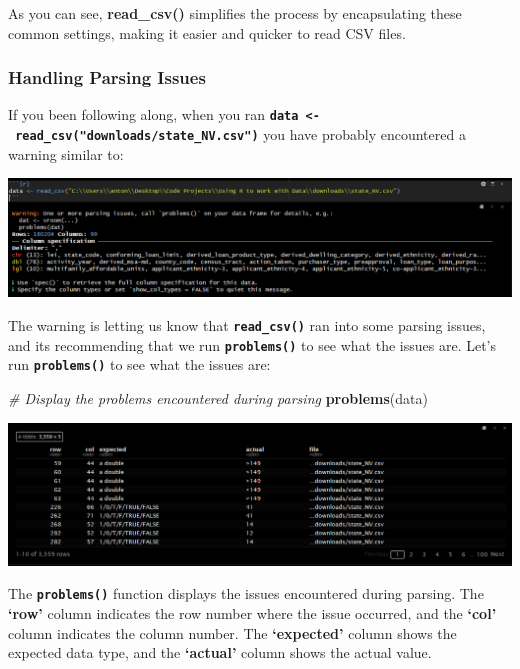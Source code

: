 \documentclass[
]{book}
\newenvironment{Shaded}{\begin{snugshade}}{\end{snugshade}}
\newcommand{\CommentTok}[1]{\textcolor[rgb]{0.56,0.35,0.01}{\textit{#1}}}
\newcommand{\FunctionTok}[1]{\textcolor[rgb]{0.13,0.29,0.53}{\textbf{#1}}}
\newcommand{\NormalTok}[1]{#1}
\begin{document}
As you can see, \textbf{read\_csv()} simplifies the process by encapsulating these common settings, making it easier and quicker to read CSV files.

\hypertarget{handling-parsing-issues}{%
\subsubsection{Handling Parsing Issues}\label{handling-parsing-issues}}

If you been following along, when you ran \textbf{\texttt{data\ \textless{}-\ read\_csv("downloads/state\_NV.csv")}} you have probably encountered a {warning} similar to:

\includegraphics{images/clipboard-3586307356.png}

The warning is letting us know that \textbf{\texttt{read\_csv()}} ran into some parsing issues, and its recommending that we run \textbf{\texttt{problems()}} to see what the issues are. Let's run \textbf{\texttt{problems()}} to see what the issues are:

\begin{Shaded}
\begin{Highlighting}[]
\CommentTok{\# Display the problems encountered during parsing}
\FunctionTok{problems}\NormalTok{(data)}
\end{Highlighting}
\end{Shaded}

\includegraphics{images/clipboard-1927136276.png}

The \textbf{\texttt{problems()}} function displays the issues encountered during parsing. The \textbf{`row'} column indicates the row number where the issue occurred, and the \textbf{`col'} column indicates the column number. The \textbf{`expected'} column shows the expected data type, and the \textbf{`actual'} column shows the actual value.
\end{document}
